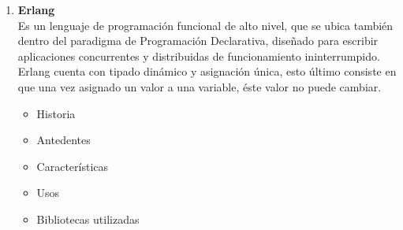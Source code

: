 \documentclass[12pt,a4paper]{article}
\begin{document}
\begin{enumerate}
\begin{itemize}
	\end{itemize}
 \item  \textbf{Erlang} \\
 Es un lenguaje de programación funcional de alto nivel, que se ubica también dentro del paradigma de Programación Declarativa, diseñado para escribir aplicaciones concurrentes y distribuidas de funcionamiento ininterrumpido. Erlang cuenta con tipado dinámico y asignación única, esto último consiste en que una vez asignado un valor a una variable, éste valor no puede cambiar.
 \begin{itemize}
 \item Historia
 \item Antedentes
 \item Características
 \item Usos
 \item Bibliotecas utilizadas
 \end{itemize}
\end{enumerate}

\pagebreak
\end{document}
